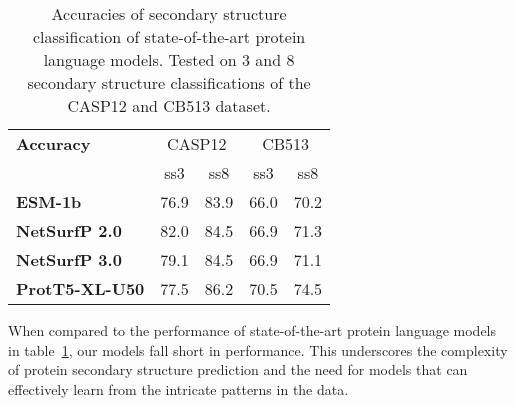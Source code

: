 \begin{table}[h]
    \caption{Accuracies of secondary structure classification of state-of-the-art protein language models. Tested on 3 and 8 secondary structure classifications of the CASP12 and CB513 dataset.}
    \label{tab:casp3}
    \centering
    \begin{tabular}{lcc|cc}
        \toprule
        \textbf{Accuracy} & \multicolumn{2}{c|}{CASP12} & \multicolumn{2}{c|}{CB513}\\
        & ss3 & ss8 & ss3 & ss8\\
        \midrule
        \textbf{ESM-1b} & 76.9 & 83.9 & 66.0 & 70.2\\
        \textbf{NetSurfP 2.0} & 82.0 & 84.5 & 66.9 & 71.3\\
        \textbf{NetSurfP 3.0} & 79.1 & 84.5 & 66.9 & 71.1\\
        \textbf{ProtT5-XL-U50} & 77.5 & 86.2 & 70.5 & 74.5\\
        \bottomrule
    \end{tabular}
  \end{table}

  When compared to the performance of state-of-the-art protein language models in table~\ref{tab:casp3}, our models fall short in performance. This underscores the complexity of protein secondary structure prediction and the need for models that can effectively learn from the intricate patterns in the data.

